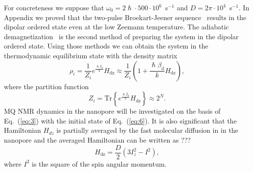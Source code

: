 \documentclass[review]{elsarticle}
\begin{document}
For concreteness we suppose that $\omega_{0} = 2\hslash \cdot 500 \cdot 10^{6}$~s$^{-1}$ and $D = 2\pi \cdot 10^{4}$~s$^{-1}$.
In Appendix we proved that the two-pulse Broekart-Jeener sequence~\cite{Andrew_1971,Jeener_1967} results in the dipolar ordered state even at the low Zeemann temperature.
The adiabatic demagnetization~\cite{Andrew_1971,Slichter_1961} is the second method of preparing the system in the dipolar ordered state.
Using those methods we can obtain the system in the thermodynamic equilibrium state with the density matrix
%
\begin{equation}
    \label{eq:5}
    \rho_i = \frac{1}{Z_i} e^\frac{\hslash\beta_\mathrm{d}}{k}H_\mathrm{dz}
    \approx \frac{1}{Z_i}(1 + \frac{\hslash\beta_\mathrm{d}}{k} H_\mathrm{dz}),
\end{equation}
%
where the partition function
%
\begin{equation}
    \label{eq:6}
    Z_i = \mathrm{Tr} \left\{ e^\frac{\hslash\beta_\mathrm{d}}{k} H_\mathrm{dz}\right\} \approx 2^{N}.
\end{equation}
%
MQ NMR dynamics in the nanopore will be investigated on the basis of Eq.~(\ref{eq:3}) with the initial state of Eq.~(\ref{eq:6}).
It is also significant that the Hamiltonian $H_{dz}$ is partially averaged by the fast molecular diffusion in in the nanopore and the averaged Hamiltonian can be written as ???
%
\begin{equation}
    \label{eq:7}
    H_\mathrm{dz} = \dfrac{D}{2} (3 I^{2}_{z} - I^{2}) , %
\end{equation}
%
where $I^{2}$ is the square of the spin angular momentum.
\end{document}
